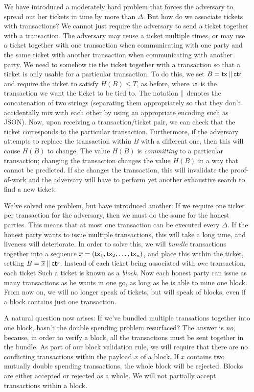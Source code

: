 We have introduced a moderately hard problem that forces the adversary to spread out her
tickets in time by more than $\Delta$. But how do we associate tickets with transactions?
We cannot just require the adversary to send a ticket together with a transaction.
The adversary may reuse a ticket multiple times, or may use a ticket together with one transaction
when communicating with one party and the same ticket with another transaction when
communicating with another party. We need to somehow tie the ticket together with a
transaction so that a ticket is only usable for a particular transaction.
To do this, we set $B = \mathsf{tx} \mathbin{\|} \mathsf{ctr}$ and require the ticket to satisfy $H(B) \leq T$,
as before, where $\mathsf{tx}$ is the transaction we want the ticket to be tied to.
The notation $\mathbin{\|}$ denotes the concatenation of two strings (separating them appropriately
so that they don't accidentally mix with each other by using an appropriate encoding such
as JSON).
Now, upon receiving a transaction/ticket pair, we can check that the ticket corresponds
to the particular transaction. Furthermore, if the adversary attempts to replace the
transaction within $B$ with a different one, then this will cause $H(B)$ to change.
The value $H(B)$ is \emph{committing} to a particular transaction; changing the transaction
changes the value $H(B)$ in a way that cannot be predicted. If she changes the transaction,
this will invalidate the proof-of-work and the adversary will have to perform yet another
exhaustive search to find a new ticket.

We've solved one problem, but have introduced another: If we require one ticket per transaction
for the adversary, then we must do the same for the honest parties. This means that at most one
transaction can be executed every $\Delta$. If the honest party wants to issue multiple transactions,
this will take a long time, and liveness will deteriorate. In order to solve this, we will \emph{bundle}
transactions together into a sequence $\overline{x} = (\mathsf{tx}_1, \mathsf{tx}_2, \ldots, \mathsf{tx}_n)$, and place
this within the ticket, setting $B = \overline{x} \mathbin{\|} \mathsf{ctr}$.
Instead of each ticket being associated with \emph{one} transaction, each ticket
Such a ticket is known as a \emph{block}.
Now each honest party can issue as many transactions
as he wants in one go, as long as he is able to mine one block.
From now on, we will no longer speak of tickets, but will speak of blocks,
even if a block contains just one transaction.

A natural question now arises: If we've bundled multiple transations together into one block,
hasn't the double spending problem resurfaced? The answer is \emph{no}, because, in order to
verify a block, all the transactions must be sent together in the bundle. As part of our block
validation rule, we will require that there are no conflicting transactions within the payload
$\overline{x}$ of a block. If $\overline{x}$ contains two mutually double spending transactions,
the whole block will be rejected. Blocks are either accepted or rejected as a whole. We will not
partially accept transactions within a block.

